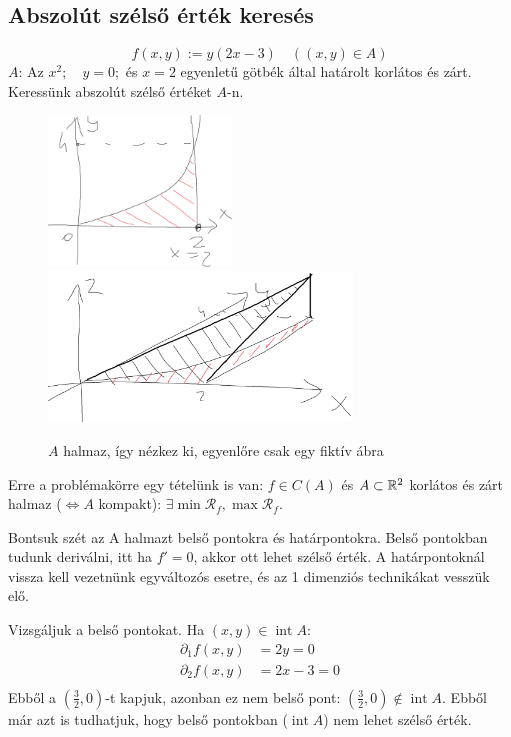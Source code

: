 \documentclass[a4paper,11.5pt]{article}
\DeclareMathOperator{\Int}{int}
\begin{document}
	\subsection{Abszolút szélső érték keresés}
	\begin{task}
		\[ f(x,y):=y(2x-3)\quad ((x,y)\in A) \]
		$A$: Az $x^2;\quad y=0;$ és $x=2$ egyenletű götbék által határolt korlátos és zárt. Keressünk abszolút szélső értéket $A$-n.
		\begin{figure}[H]
			\centering
			\includegraphics[height=4cm]{../2zh/kepek/46.png}\quad \quad \quad 
			\includegraphics[height=4cm]{../2zh/kepek/47.png}
			\caption{$A$ halmaz, így nézkez ki, egyenlőre csak egy fiktív ábra}
		\end{figure}
		Erre a problémakörre egy tételünk is van: $f\in C(A)$ és $A\subset\mathbb{R}^2$ korlátos és zárt halmaz ($\Leftrightarrow A$ kompakt): $\exists\min\mathcal{R}_f, \max\mathcal{R}_f$.
		
		Bontsuk szét az A halmazt belső pontokra és határpontokra. Belső pontokban tudunk deriválni, itt ha $f'=0$, akkor ott lehet szélső érték. A határpontoknál vissza kell vezetnünk egyváltozós esetre, és az 1 dimenziós technikákat vesszük elő.
		
		\smallskip
		Vizsgáljuk a belső pontokat. Ha $(x,y)\in\Int A$:
		\begin{align*}
			\partial_1f(x,y)&=2y=0\\
			\partial_2f(x,y)&=2x-3=0\\
		\end{align*}
		Ebből a $\left(\frac{3}{2},0\right)$-t kapjuk, azonban ez nem belső pont: $\left(\frac{3}{2},0\right)\notin\Int A$. Ebből már azt is tudhatjuk, hogy belső pontokban ($\Int A$) nem lehet szélső érték.
		\medskip
		

\end{task}
\end{document}
